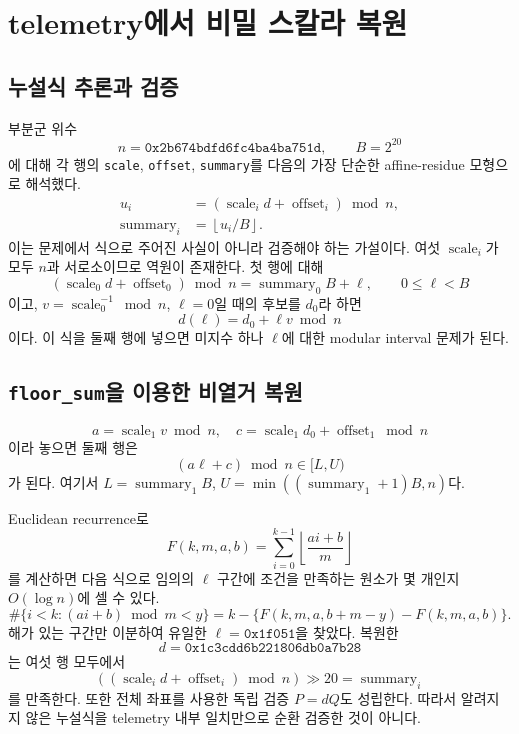 \documentclass[10pt,a4paper]{article}
\begin{document}
\section{telemetry에서 비밀 스칼라 복원}

\subsection{누설식 추론과 검증}

부분군 위수
\[
  n=\texttt{0x2b674bdfd6fc4ba4ba751d},\qquad B=2^{20}
\]
에 대해 각 행의 \texttt{scale}, \texttt{offset}, \texttt{summary}를
다음의 가장 단순한 affine-residue 모형으로 해석했다.
\[
\begin{aligned}
u_i&=(\operatorname{scale}_i d+\operatorname{offset}_i)\bmod n,\\
\operatorname{summary}_i&=\left\lfloor u_i/B\right\rfloor.
\end{aligned}
\]
이는 문제에서 식으로 주어진 사실이 아니라 검증해야 하는 가설이다.
여섯 \(\operatorname{scale}_i\)가 모두 \(n\)과 서로소이므로 역원이 존재한다.
첫 행에 대해
\[
 (\operatorname{scale}_0d+\operatorname{offset}_0)\bmod n
   =\operatorname{summary}_0B+\ell,\qquad 0\le\ell<B
\]
이고, \(v=\operatorname{scale}_0^{-1}\bmod n\), \(\ell=0\)일 때의 후보를
\(d_0\)라 하면
\[
 d(\ell)=d_0+\ell v\bmod n
\]
이다. 이 식을 둘째 행에 넣으면 미지수 하나 \(\ell\)에 대한 modular
interval 문제가 된다.

\subsection{\texttt{floor\_sum}을 이용한 비열거 복원}

\[
 a=\operatorname{scale}_1v\bmod n,\quad
 c=\operatorname{scale}_1d_0+\operatorname{offset}_1\bmod n
\]
이라 놓으면 둘째 행은
\[
 (a\ell+c)\bmod n\in[L,U)
\]
가 된다. 여기서 \(L=\operatorname{summary}_1B\),
\(U=\min((\operatorname{summary}_1+1)B,n)\)다.

Euclidean recurrence로
\[
 F(k,m,a,b)=\sum_{i=0}^{k-1}
  \left\lfloor\frac{ai+b}{m}\right\rfloor
\]
를 계산하면 다음 식으로 임의의 \(\ell\) 구간에 조건을 만족하는 원소가
몇 개인지 \(O(\log n)\)에 셀 수 있다.
\[
\#\{i<k:(ai+b)\bmod m<y\}
=k-\{F(k,m,a,b+m-y)-F(k,m,a,b)\}.
\]
해가 있는 구간만 이분하여 유일한
\(\ell=\texttt{0x1f051}\)을 찾았다. 복원한
\[
d=\texttt{0x1c3cdd6b221806db0a7b28}
\]
는 여섯 행 모두에서
\[
 ((\operatorname{scale}_i d+\operatorname{offset}_i)\bmod n)\gg20
  =\operatorname{summary}_i
\]
를 만족한다. 또한 전체 좌표를 사용한 독립 검증 \(P=dQ\)도 성립한다.
따라서 알려지지 않은 누설식을 telemetry 내부 일치만으로 순환 검증한 것이
아니다.
\end{document}
